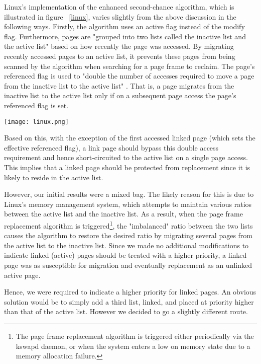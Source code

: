 \documentclass[10pt,a4paper,twocolumn]{article}
\begin{document}
Linux's implementation of the enhanced second-chance algorithm, which is illustrated in figure
~\ref{linux}, varies slightly from the above discussion in the following ways. Firstly, the
algorithm uses an active flag instead of the modify flag. Furthermore, pages are "grouped into two
lists called the inactive list and the active list" \cite{BOU} based on how recently the
page was accessed. By migrating recently accessed pages to an active list, it prevents these pages
from being scanned by the algorithm when searching for a page frame to reclaim. The page's
referenced flag is used to "double the number of accesses required to move a page from the inactive
list to the active list" \cite{BOU}. That is, a page migrates from the inactive list to the
active list only if on a subsequent page access the page's referenced flag is set.

\begin{figure*}[htbp]
\centering
\texttt{[image: linux.png]}
\caption{\emph{\small Page migration between the active and inactive lists in the Linux Kernel}}
\label{linux}
\end{figure*}

Based on this, with the exception of the first accessed linked page (which sets the effective
referenced flag), a link page should bypass this double access requirement and hence short-circuited
to the active list on a single page access. This implies that a linked page should be protected from
replacement since it is likely to reside in the active list.
 
However, our initial results were a mixed bag. The likely reason for this is due to Linux's memory
management system, which attempts to maintain various ratios between the active list and the
inactive list. As a result, when the page frame replacement algorithm is triggered\footnote{The page
frame replacement algorithm is triggered either periodically via the kswapd daemon, or when the
system enters a low on memory state due to a memory allocation failure.}, the "imbalanced" ratio
between the two lists causes the algorithm to restore the desired ratio by migrating several pages
from the active list to the inactive list. Since we made no additional modifications to indicate
linked (active) pages should be treated with a higher priority, a linked page was as susceptible for
migration and eventually replacement as an unlinked active page.

Hence, we were required to indicate a higher priority for linked pages. An obvious solution would be
to simply add a third list, linked, and placed at priority higher than that of the active list.
However we decided to go a slightly different route.
 
\end{document}
